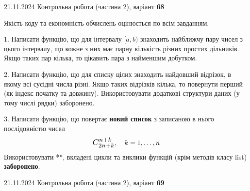 \documentclass[12pt, ukrainian]{article}
\begin{document}
{{{{{{{{\begin {large}
\end{large}
\newpage
{{21.11.2024 Контрольна робота  (частина 2), варіант  \No \textbf { 68 }\par}}


{
\begin {large}
Якість коду та економність обчислень оцінюється по всім завданням.

\vspace{5mm}

1. Написати функцію, що для інтервалу $[a, b)$ знаходить найближчу пару чисел з цього інтервалу, що кожне з них має парну кількість різних простих дільників. Якщо таких пар кілька, то цікавить пара з найменшим добутком.

\vspace{10mm}


2. Написати функцію, що для списку цілих знаходить найдовший відрізок, в якому всі сусідні числа різні. Якщо таких відрізків кілька, то повернути перший (як індекс початку та довжину). Використовувати додаткові структури даних (у тому числі рядки) заборонено.

\vspace{10mm}


3. 
Написати функцію, що повертає \textbf{новий список} з записаною в нього послідовністю чисел
$$\scalebox{1.2}{$C_{2n+k}^{n+k}$}, \quad k=1,\ldots,n$$
Використовувати **, вкладені цикли та виклики функцій (крім методів класу list) \textbf{заборонено}.

\end{large}
\vspace{25mm}


{{21.11.2024 Контрольна робота  (частина 2), варіант  \No \textbf { 69 }\par}}


}}}}}}}}}
\end{document}
